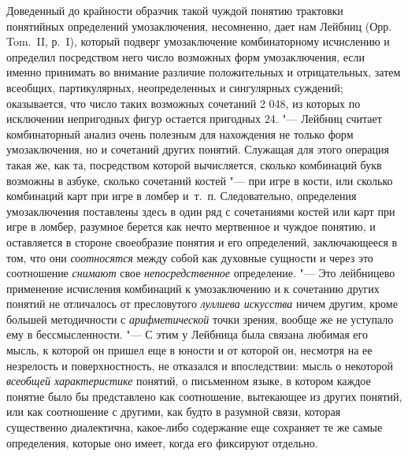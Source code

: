 Доведенный до крайности образчик такой чуждой понятию
трактовки понятийных определений умозаключения, несомненно, дает нам Лейбниц
(Орр. Tom.~II, р.~I), который подверг умозаключение
комбинаторному исчислению и определил посредством него число возможных форм
умозаключения, если именно принимать во внимание различие положительных и
отрицательных, затем всеобщих, партикулярных, неопределенных и сингулярных
суждений; оказывается, что число таких возможных сочетаний 2 048, из
которых по исключении непригодных фигур остается пригодных 24. "---
Лейбниц считает комбинаторный анализ очень полезным для
нахождения не только форм умозаключения, но и сочетаний других понятий.
Служащая для этого операция такая же, как та, посредством которой
вычисляется, сколько комбинаций букв возможны в азбуке, сколько сочетаний
костей "--- при игре в кости, или сколько комбинаций карт при
игре в ломбер и~т.~п. Следовательно, определения умозаключения поставлены
здесь в один ряд с сочетаниями костей или карт при игре в ломбер, разумное
берется как нечто мертвенное и чуждое понятию, и оставляется в стороне
своеобразие понятия и его определений, заключающееся в том, что они
{\em соотносятся} между
собой как духовные сущности и через это соотношение
{\em снимают} свое
{\em непосредственное}
определение. "--- Это лейбницево
применение исчисления комбинаций к умозаключению и к сочетанию других
понятий не отличалось от пресловутого
{\em луллиева искусства}
ничем другим, кроме большей методичности с
{\em арифметической}
точки зрения, вообще же не уступало ему в бессмысленности. "---
С этим у Лейбница была связана любимая его мысль, к которой
он пришел еще в юности и от которой он, несмотря на ее незрелость и
поверхностность, не отказался и впоследствии: мысль о некоторой
{\em всеобщей характеристике}
понятий, о письменном языке, в котором каждое понятие было бы
представлено как соотношение, вытекающее из других понятий, или как
соотношение с другими, как будто в разумной связи, которая существенно
диалектична, какое-либо содержание еще сохраняет те же самые определения,
которые оно имеет, когда его фиксируют отдельно.


